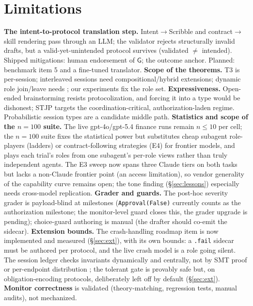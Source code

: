 \documentclass{article}
\newcommand{\gtG}{\mathsf{G}}
\newcommand{\stjp}{\textsc{STJP}}
\begin{document}
\section{Limitations}\label{sec:limits}
\textbf{The intent-to-protocol translation step.} Intent$\to$Scribble and contract$\to$skill rendering pass through an LLM; the validator rejects structurally invalid drafts, but a valid-yet-unintended protocol survives (validated $\neq$ intended). Shipped mitigations: human endorsement of $\gtG$; the outcome anchor. Planned: benchmark item 5 and a fine-tuned translator. \textbf{Scope of the theorems.} T3 is per-session; interleaved sessions need compositional/hybrid extensions; dynamic role join/leave needs \citep{denielou11}; our experiments fix the role set. \textbf{Expressiveness.} Open-ended brainstorming resists protocolization, and forcing it into a type would be dishonest; \stjp{} targets the coordination-critical, authorization-laden regime. Probabilistic session types are a candidate middle path. \textbf{Statistics and scope of the $n{=}100$ suite.} The live gpt-4o/gpt-5.4 finance runs remain $n\leq10$ per cell; the $n{=}100$ suite fixes the statistical power but substitutes cheap subagent role-players (ladders) or contract-following strategies (E4) for frontier models, and plays each trial's roles from one subagent's per-role views rather than truly independent agents. The E3 sweep now spans three Claude tiers on both tasks but lacks a non-Claude frontier point (an access limitation), so vendor generality of the capability curve remains open; the tone finding (\S\ref{sec:lessons}) especially needs cross-model replication. \textbf{Grader and guards.} The post-hoc severity grader is payload-blind at milestones (\texttt{Approval(False)} currently counts as the authorization milestone; the monitor-level guard closes this, the grader upgrade is pending); choice-guard authoring is manual (the drafter should co-emit the sidecar). \textbf{Extension bounds.} The crash-handling roadmap item is now implemented and measured (\S\ref{sec:ext}), with its own bounds: a \texttt{.fail} sidecar must be authored per protocol, and the live crash model is a role going silent. The session ledger checks invariants dynamically and centrally, not by SMT proof or per-endpoint distribution \citep{chen12}; the tolerant gate is provably safe but, on obligation-encoding protocols, deliberately left off by default (\S\ref{sec:ext}). \textbf{Monitor correctness} is validated (theory-matching, regression tests, manual audits), not mechanized.
\end{document}
